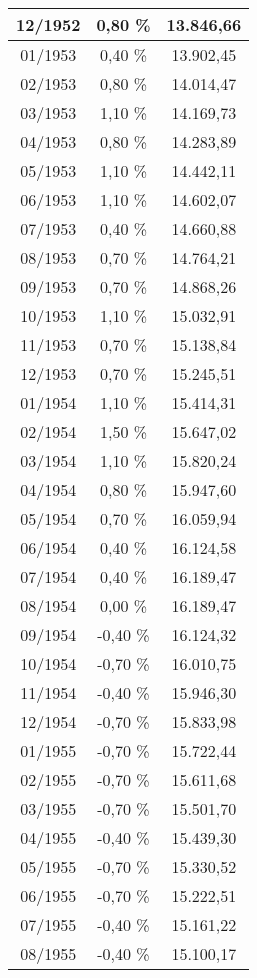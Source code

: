 \begin{center}
\begin{longtable}{|c|c|c|}
12/1952 & 0,80 \% & 13.846,66 \\ \hline
01/1953 & 0,40 \% & 13.902,45 \\ \hline
02/1953 & 0,80 \% & 14.014,47 \\ \hline
03/1953 & 1,10 \% & 14.169,73 \\ \hline
04/1953 & 0,80 \% & 14.283,89 \\ \hline
05/1953 & 1,10 \% & 14.442,11 \\ \hline
06/1953 & 1,10 \% & 14.602,07 \\ \hline
07/1953 & 0,40 \% & 14.660,88 \\ \hline
08/1953 & 0,70 \% & 14.764,21 \\ \hline
09/1953 & 0,70 \% & 14.868,26 \\ \hline
10/1953 & 1,10 \% & 15.032,91 \\ \hline
11/1953 & 0,70 \% & 15.138,84 \\ \hline
12/1953 & 0,70 \% & 15.245,51 \\ \hline
01/1954 & 1,10 \% & 15.414,31 \\ \hline
02/1954 & 1,50 \% & 15.647,02 \\ \hline
03/1954 & 1,10 \% & 15.820,24 \\ \hline
04/1954 & 0,80 \% & 15.947,60 \\ \hline
05/1954 & 0,70 \% & 16.059,94 \\ \hline
06/1954 & 0,40 \% & 16.124,58 \\ \hline
07/1954 & 0,40 \% & 16.189,47 \\ \hline
08/1954 & 0,00 \% & 16.189,47 \\ \hline
09/1954 & -0,40 \% & 16.124,32 \\ \hline
10/1954 & -0,70 \% & 16.010,75 \\ \hline
11/1954 & -0,40 \% & 15.946,30 \\ \hline
12/1954 & -0,70 \% & 15.833,98 \\ \hline
01/1955 & -0,70 \% & 15.722,44 \\ \hline
02/1955 & -0,70 \% & 15.611,68 \\ \hline
03/1955 & -0,70 \% & 15.501,70 \\ \hline
04/1955 & -0,40 \% & 15.439,30 \\ \hline
05/1955 & -0,70 \% & 15.330,52 \\ \hline
06/1955 & -0,70 \% & 15.222,51 \\ \hline
07/1955 & -0,40 \% & 15.161,22 \\ \hline
08/1955 & -0,40 \% & 15.100,17 \\ \hline

\end{longtable}
\end{center}
